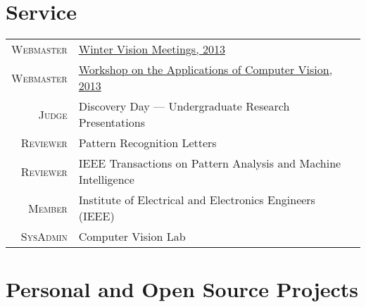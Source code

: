 \documentclass[10pt]{article}
\begin{document}
\section{Service}
\vspace{-1em}
\newcommand{\service}[2]{
  \textsc{#1} & #2\\
}
\begin{longtable}{r|p{10cm}}
  \service{Webmaster}{\href{http://cvl.cse.sc.edu/wvm2013/}{Winter Vision Meetings, 2013}}
  \service{Webmaster}{\href{http://cvl.cse.sc.edu/wacv2013/}{Workshop on the Applications of Computer Vision, 2013}}
  \service{Judge}{Discovery Day --- Undergraduate Research Presentations}
  \service{Reviewer}{Pattern Recognition Letters}
  \service{Reviewer}{IEEE Transactions on Pattern Analysis and Machine Intelligence}
  \service{Member}{Institute of Electrical and Electronics Engineers (IEEE)}
  \service{SysAdmin}{Computer Vision Lab}
\end{longtable}

\section{Personal and Open Source Projects}
\newcommand{\proj}[3]{
  \textsc{#1} & #2\\
   &\href{http://www.#3}{#3}\\
   \multicolumn{2}{c}{} \\ [-1.5ex]
}

\newcommand{\projlh}[4]{
  \textsc{#1} & #2\\
   &\href{#3}{#4}\\
}
\end{document}
